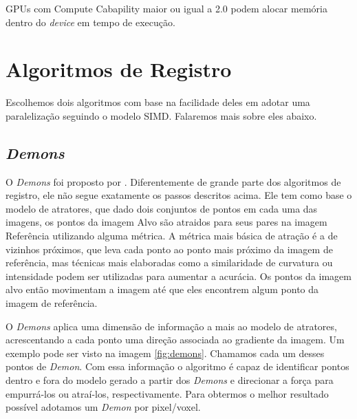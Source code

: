 GPUs com Compute Cabapility maior ou igual a 2.0 podem alocar memória dentro do \textit{device} em tempo de execução.

\section{Algoritmos de Registro}\label{sec:algReg}
    Escolhemos dois algoritmos com base na facilidade deles em adotar uma paralelização seguindo o modelo SIMD.
Falaremos mais sobre eles abaixo.

\subsection{\textit{Demons}}
    O \textit{Demons} foi proposto por \cite{thirion1995fast}. Diferentemente de grande parte dos algoritmos de registro,
ele não segue exatamente os passos descritos acima. Ele tem como base o modelo de atratores, que dado dois conjuntos de pontos
em cada uma das imagens, os pontos da imagem Alvo são atraidos para seus pares na imagem Referência utilizando alguma métrica.
A métrica mais básica de atração é a de vizinhos próximos, que leva cada ponto ao ponto mais próximo da imagem de 
referência, mas técnicas mais elaboradas como a similaridade de curvatura ou intensidade podem ser utilizadas para 
aumentar a acurácia. Os pontos da imagem alvo então movimentam a imagem até que eles encontrem algum ponto da imagem
de referência.

    O \textit{Demons} aplica uma dimensão de informação a mais ao modelo de atratores, acrescentando a cada ponto uma direção
associada ao gradiente da imagem. Um exemplo pode ser visto na imagem \ref{fig:demons}. 
Chamamos cada um desses pontos de \textit{Demon}. Com essa informação o algoritmo é capaz
de identificar pontos dentro e fora do modelo gerado a partir dos \textit{Demons} e direcionar a força para empurrá-los ou
atraí-los, respectivamente. Para obtermos o melhor resultado possível adotamos um \textit{Demon} por pixel/voxel.

